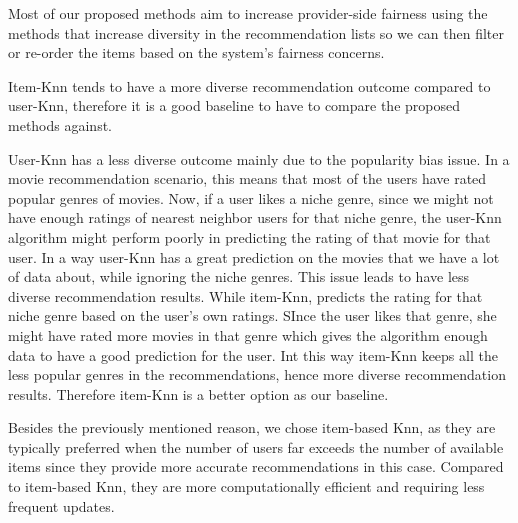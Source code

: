         Most of our proposed methods aim to increase provider-side fairness using the methods that increase diversity in the recommendation lists so we can then filter or re-order the items based on the system's fairness concerns. 
        
        Item-Knn tends to have a more diverse recommendation outcome compared to user-Knn, therefore it is a good baseline to have to compare the proposed methods against.
        
        User-Knn has a less diverse outcome mainly due to the popularity bias issue. In a movie recommendation scenario, this means that most of the users have rated popular genres of movies. Now, if a user likes a niche genre, since we might not have enough ratings of nearest neighbor users for that niche genre, the user-Knn algorithm might perform poorly in predicting the rating of that movie for that user. In a way user-Knn has a great prediction on the movies that we have a lot of data about, while ignoring the niche genres. This issue leads to have less diverse recommendation results. While item-Knn, predicts the rating for that niche genre based on the user's own ratings. SInce the user likes that genre, she might have rated more movies in that genre which gives the algorithm enough data to have a good prediction for the user. Int this way item-Knn keeps all the less popular genres in the recommendations, hence more diverse recommendation results. Therefore item-Knn is a better option as our baseline.
        
        
        Besides the previously mentioned reason, we chose item-based Knn, as they are typically preferred when the number of users far exceeds the number of available items since they provide more accurate recommendations in this case. Compared to item-based Knn, they are more computationally efficient and requiring less frequent updates.

